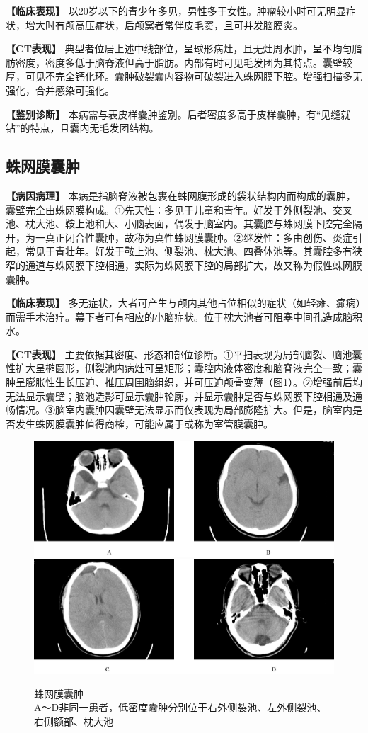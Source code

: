 \textbf{【临床表现】}
以20岁以下的青少年多见，男性多于女性。肿瘤较小时可无明显症状，增大时有颅高压症状，后颅窝者常伴皮毛窦，且可并发脑膜炎。

\textbf{【CT表现】}
典型者位居上述中线部位，呈球形病灶，且无灶周水肿，呈不均匀脂肪密度，密度多低于脑脊液但高于脂肪。内部有时可见毛发团为其特点。囊壁较厚，可见不完全钙化环。囊肿破裂囊内容物可破裂进入蛛网膜下腔。增强扫描多无强化，合并感染可强化。

\textbf{【鉴别诊断】}
本病需与表皮样囊肿鉴别。后者密度多高于皮样囊肿，有“见缝就钻”的特点，且囊内无毛发团结构。

\subsection{蛛网膜囊肿}

\textbf{【病因病理】}
本病是指脑脊液被包裹在蛛网膜形成的袋状结构内而构成的囊肿，囊壁完全由蛛网膜构成。①先天性：多见于儿童和青年。好发于外侧裂池、交叉池、枕大池、鞍上池和大、小脑表面，偶发于脑室内。其囊腔与蛛网膜下腔完全隔开，为一真正闭合性囊肿，故称为真性蛛网膜囊肿。②继发性：多由创伤、炎症引起，常见于青壮年。好发于鞍上池、侧裂池、枕大池、四叠体池等。其囊腔多有狭窄的通道与蛛网膜下腔相通，实际为蛛网膜下腔的局部扩大，故又称为假性蛛网膜囊肿。

\textbf{【临床表现】}
多无症状，大者可产生与颅内其他占位相似的症状（如轻瘫、癫痫）而需手术治疗。幕下者可有相应的小脑症状。位于枕大池者可阻塞中间孔造成脑积水。

\textbf{【CT表现】}
主要依据其密度、形态和部位诊断。①平扫表现为局部脑裂、脑池囊性扩大呈椭圆形，侧裂池内病灶可呈矩形；囊腔内液体密度和脑脊液完全一致；囊肿呈膨胀性生长压迫、推压周围脑组织，并可压迫颅骨变薄（图\ref{fig2-50}）。②增强前后均无法显示囊壁；脑池造影可显示囊肿轮廓，并显示囊肿是否与蛛网膜下腔相通及通畅情况。③脑室内囊肿因囊壁无法显示而仅表现为局部膨隆扩大。但是，脑室内是否发生蛛网膜囊肿值得商榷，可能应属于或称为室管膜囊肿。



\begin{figure}[!htbp]
 \centering
 \includegraphics[width=.7\textwidth,height=\textheight,keepaspectratio]{./images/Image00081.jpg}
 \includegraphics[width=.7\textwidth,height=\textheight,keepaspectratio]{./images/Image00082.jpg}
 \captionsetup{justification=centering}
 \caption{蛛网膜囊肿\\{\small A～D非同一患者，低密度囊肿分别位于右外侧裂池、左外侧裂池、右侧额部、枕大池}}
 \label{fig2-50}
  \end{figure} 

